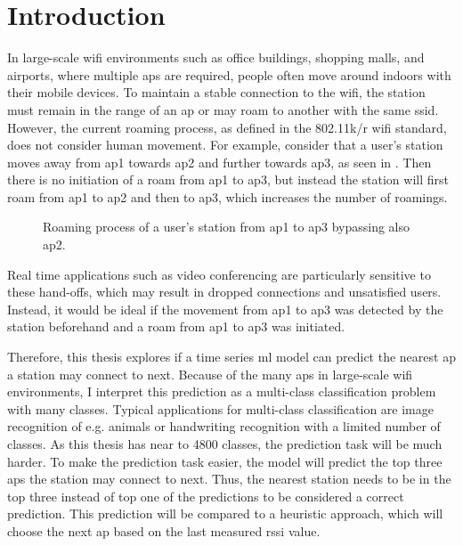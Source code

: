 \chapter{Introduction}\label{ch:intro}

In large-scale \ac{wifi} environments such as office buildings, shopping malls, and airports, where multiple \acp{ap} are required, people often move around indoors with their mobile devices.
To maintain a stable connection to the \ac{wifi}, the station must remain in the range of an \ac{ap} or may roam to another with the same \ac{ssid}.
However, the current roaming process, as defined in the 802.11k/r\cite{802.11k}\cite{802.11r} \ac{wifi} standard, does not consider human movement.
For example, consider that a user's station moves away from \ac{ap}1 towards \ac{ap}2 and further towards \ac{ap}3, as seen in .
Then there is no initiation of a roam from \ac{ap}1 to \ac{ap}3, but instead the station will first roam from \ac{ap}1 to \ac{ap}2 and then to \ac{ap}3, which increases the number of roamings.

\begin{figure}[h]
    \centering
    
    \caption{Roaming process of a user's station from \ac{ap}1 to \ac{ap}3 bypassing also \ac{ap}2.}
    \label{fig:roaming}
\end{figure}

Real time applications such as video conferencing are particularly sensitive to these hand-offs, which may result in dropped connections and unsatisfied users.
Instead, it would be ideal if the movement from \ac{ap}1 to \ac{ap}3 was detected by the station beforehand and a roam from \ac{ap}1 to \ac{ap}3 was initiated.

Therefore, this thesis explores if a time series \ac{ml} model can predict the nearest \ac{ap} a station may connect to next.
Because of the many \acp{ap} in large-scale \ac{wifi} environments, I interpret this prediction as a multi-class classification problem with many classes.
Typical applications for multi-class classification are image recognition of e.g. animals or handwriting recognition with a limited number of classes.
As this thesis has near to 4800 classes, the prediction task will be much harder.
To make the prediction task easier, the model will predict the top three \acp{ap} the station may connect to next.
Thus, the nearest station needs to be in the top three instead of top one of the predictions to be considered a correct prediction.
This prediction will be compared to a heuristic approach, which will choose the next \ac{ap} based on the last measured \ac{rssi} value.

